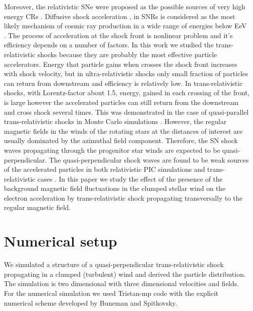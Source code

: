 \documentclass[a4paper]{jpconf}
\begin{document}
Moreover, the relativistic SNe were proposed as the possible sources of very high energy CRs \cite{2007PhRvD..76h3009W,2011NatCo...2E.175C,2008ApJ...673..928B,2013ApJ...776...46E,BEMO18}. Diffusive shock acceleration \cite{Bell78}, \cite{Blandford78} in SNRs is considered as the most likely mechanism of cosmic ray production in a wide range of energies below EeV \cite{BEMO18}. The process of acceleration at the shock front is nonlinear problem and it's efficiency depends on a number of factors. In this work we studied the trans-relativistic shocks because they are probably the most effective particle accelerators. Energy that particle gains when crosses the shock front increases with shock velocity, but in ultra-relativistic shocks only small fraction of particles can return from downstream and efficiency is relatively low. In trans-relativistic shocks, with Lorentz-factor about 1.5, energy, gained in each crossing of the front, is large however the accelerated particles  can still return from the downstream and cross shock several times. This was demonstrated in the case of quasi-parallel trans-relativistic shocks in Monte Carlo simulations \cite{2013ApJ...776...46E,BEMO18}. However, the regular magnetic fields in the winds of the rotating stars at the distances of interest are usually dominated by the azimuthal field component. Therefore, the SN shock waves propagating through the progenitor star winds are expected to be quasi-perpendicular.  The quasi-perpendicular shock waves are found to be weak sources of the accelerated particles in both  relativistic PIC simulations \cite{Sironi2011} and trans-relativistic cases \cite{Romansky18,Crumley2019}. In this paper we study the effect of the presence of  the background magnetic field fluctuations in the clumped stellar wind on the electron acceleration by trans-relativistic shock propagating transversally to the regular magnetic field.   

\section{Numerical setup}
We simulated a structure of a quasi-perpendicular trans-relativistic shock propagating in a clumped (turbulent) wind and derived the particle distribution. 
The simulation is two dimensional with three dimensional velocities and fields. For the numerical simulation we used Tristan-mp code with the explicit numerical
 scheme developed by Buneman \cite{Buneman93} and  Spitkovsky\cite{Spitkovsky2005}.
\end{document}
